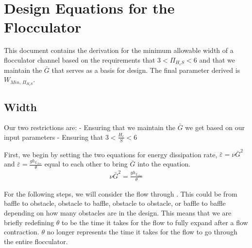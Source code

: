 \documentclass[letterpaper,10pt,english]{sphinxmanual}
\begin{document}
{\section{Design Equations for the Flocculator}
\label{\detokenize{Flocculation/Floc_Derivations:design-equations-for-the-flocculator}}\label{\detokenize{Flocculation/Floc_Derivations:heading-design-equations-for-the-flocculator}}
This document contains the derivation for the minimum allowable width of
a flocculator channel based on the requirements that
\(3 < \Pi_{H_eS} < 6\) and that we maintain the \(\bar G\) that
serves as a basis for design. The final parameter derived is
\(W_{Min, \, \Pi_{H_eS}}\).


\subsection{Width}
\label{\detokenize{Flocculation/Floc_Derivations:width}}
Our two restrictions are: - Ensuring that we maintain the \(\bar G\)
we get based on our input parameters - Ensuring that
\(3 < \frac{H_e}{S} < 6\)

First, we begin by setting the two equations for energy dissipation
rate, \(\bar \varepsilon = \nu \bar G^2\) and
\(\bar \varepsilon = \frac{g h_{L_{floc}}}{\theta}\) equal to each
other to bring \(\bar G\) into the equation.
\begin{equation}\label{equation:Flocculation/Floc_Derivations:Flocculation/Floc_Derivations:0}
\begin{split}\nu \bar G^2 = \frac{g h_{L_{floc}}}{\theta}\end{split}
\end{equation}

For the following steps, we will consider the flow through . This
could be from baffle to obstacle, obstacle to baffle, obstacle to
obstacle, or baffle to baffle depending on how many obstacles are in the
design. This means that we are briefly redefining \(\theta\) to be
the time it takes for the flow to fully expand after a flow contraction.
\(\theta\) no longer represents the time it takes for the flow to go
through the entire flocculator.

}
\end{document}
